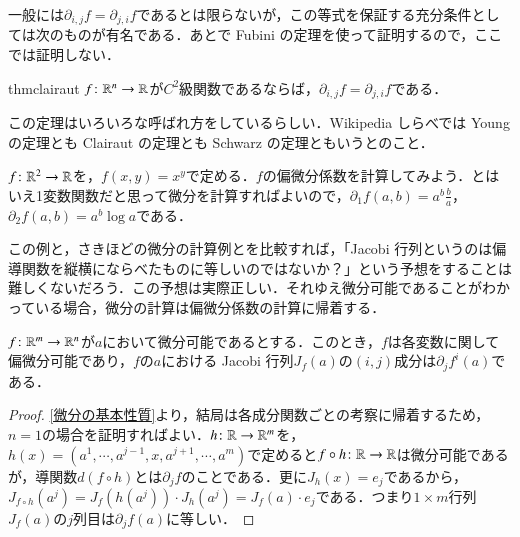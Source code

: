 一般には$\partial_{i,j} f = \partial_{j,i} f$であるとは限らないが，この等式を保証する充分条件としては次のものが有名である．あとで Fubini の定理を使って証明するので，ここでは証明しない．

\begin{restatable}{thm}{clairaut}\label{clairaut}
$f \colon \mathbb{R}^n \to \mathbb{R}$が$C^2$級関数であるならば，$\partial_{i,j} f = \partial_{j,i} f$である．
\end{restatable}

\begin{dig}
この定理はいろいろな呼ばれ方をしているらしい．Wikipedia しらべでは Young の定理とも Clairaut の定理とも Schwarz の定理ともいうとのこと．
\end{dig}

\begin{exm}
$f \colon \mathbb{R}^2 \to \mathbb{R}$を，$f(x,y) = x^y$で定める．$f$の偏微分係数を計算してみよう．とはいえ1変数関数だと思って微分を計算すればよいので，$\partial_1 f (a,b) = a^b \frac{b}{a}$，$\partial_2 f (a,b) = a^b \log a$である．
\end{exm}

この例と，さきほどの微分の計算例とを比較すれば，「Jacobi 行列というのは偏導関数を縦横にならべたものに等しいのではないか？」という予想をすることは難しくないだろう．この予想は実際正しい．それゆえ微分可能であることがわかっている場合，微分の計算は偏微分係数の計算に帰着する．

\begin{thm}\label{微分可能なら偏微分可能}
$f \colon \mathbb{R}^m \to \mathbb{R}^n$が$a$において微分可能であるとする．このとき，$f$は各変数に関して偏微分可能であり，$f$の$a$における Jacobi 行列$J_f(a)$の$(i,j)$成分は$\partial_jf^i(a)$である．
\end{thm}

\begin{proof}
\cref{微分の基本性質}より，結局は各成分関数ごとの考察に帰着するため，$n=1$の場合を証明すればよい．$h \colon \mathbb{R} \to \mathbb{R}^m$を，$h(x) = (a^1 , \cdots, a^{j-1}, x, a^{j+1}, \cdots, a^m)$で定めると$f \circ h \colon \mathbb{R} \to \mathbb{R}$は微分可能であるが，導関数$d(f \circ h)$とは$\partial_j f$のことである．更に$J_h(x) = e_j$であるから，$J_{f \circ h} \left(a^j\right)= J_f \left(h\left(a^j\right)\right) \cdot J_h\left(a^j\right) =  J_f \left(a\right) \cdot e_j$である．つまり$1 \times m$行列$J_f \left(a\right)$の$j$列目は$\partial_j f(a)$に等しい．
\end{proof}

